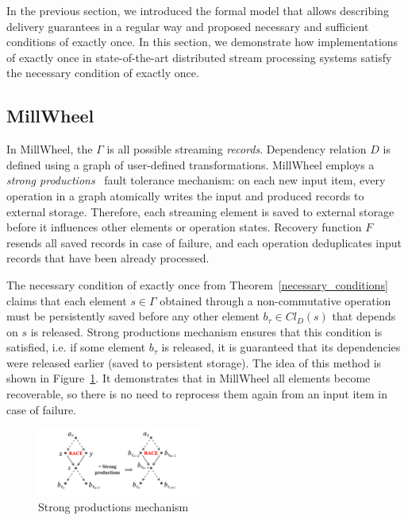 \label{fs-eo-impl}

In the previous section, we introduced the formal model that allows describing delivery guarantees in a regular way and proposed necessary and sufficient conditions of exactly once. In this section, we demonstrate how implementations of exactly once in state-of-the-art distributed stream processing systems satisfy the necessary condition of exactly once. 

\subsection{MillWheel}

In MillWheel, the $\Gamma$ is all possible streaming {\em records}. Dependency relation $D$ is defined using a graph of user-defined transformations. MillWheel employs a {\em strong productions}~\cite{Akidau:2013:MFS:2536222.2536229} fault tolerance mechanism: on each new input item, every operation in a graph atomically writes the input and produced records to external storage. Therefore, each streaming element is saved to external storage before it influences other elements or operation states. Recovery function $F$ resends all saved records in case of failure, and each operation deduplicates input records that have been already processed.

The necessary condition of exactly once from Theorem~\ref{necessary_conditions} claims that each element $s \in \Gamma$ obtained through a non-commutative operation must be persistently saved before any other element $b_{\tau} \in Cl_D(s)$ that depends on $s$ is released. Strong productions mechanism ensures that this condition is satisfied, i.e. if some element $b_\tau$ is released, it is guaranteed that its dependencies were released earlier (saved to persistent storage). The idea of this method is shown in Figure~\ref{millwheel}. It demonstrates that in MillWheel all elements become recoverable, so there is no need to reprocess them again from an input item in case of failure. 

\begin{figure}[htbp]
  \centering
  \includegraphics[width=0.48\textwidth]{pics/millwheel}
  \caption{Strong productions mechanism}
  \label{millwheel}
\end{figure}

